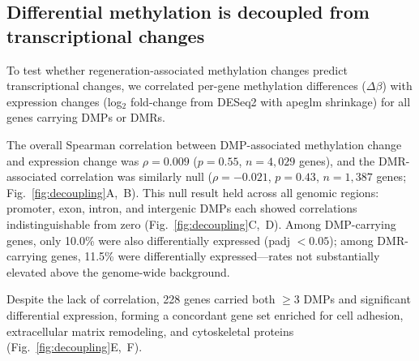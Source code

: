 \documentclass[12pt]{article}
\begin{document}

\subsection*{Differential methylation is decoupled from transcriptional changes}

To test whether regeneration-associated methylation changes predict transcriptional changes, we correlated per-gene methylation differences ($\Delta\beta$) with expression changes (log$_2$ fold-change from DESeq2 with apeglm shrinkage) for all genes carrying DMPs or DMRs.

The overall Spearman correlation between DMP-associated methylation change and expression change was $\rho = 0.009$ ($p = 0.55$, $n = 4{,}029$ genes), and the DMR-associated correlation was similarly null ($\rho = -0.021$, $p = 0.43$, $n = 1{,}387$ genes; Fig.~\ref{fig:decoupling}A,~B). This null result held across all genomic regions: promoter, exon, intron, and intergenic DMPs each showed correlations indistinguishable from zero (Fig.~\ref{fig:decoupling}C,~D). Among DMP-carrying genes, only 10.0\% were also differentially expressed (padj $< 0.05$); among DMR-carrying genes, 11.5\% were differentially expressed---rates not substantially elevated above the genome-wide background.

Despite the lack of correlation, 228 genes carried both $\geq$3 DMPs and significant differential expression, forming a concordant gene set enriched for cell adhesion, extracellular matrix remodeling, and cytoskeletal proteins (Fig.~\ref{fig:decoupling}E,~F).
\end{document}
